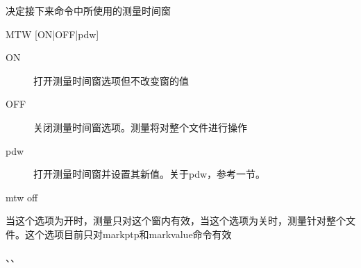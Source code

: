 \label{cmd:mtw}

决定接下来命令中所使用的测量时间窗

\begin{SACSTX}
MTW [ON|OFF|pdw]
\end{SACSTX}

\begin{description}
\item [ON] 打开测量时间窗选项但不改变窗的值 
\item [OFF] 关闭测量时间窗选项。测量将对整个文件进行操作 
\item [pdw] 打开测量时间窗并设置其新值。关于pdw，参考一节。
\end{description}

\begin{SACDFT}
mtw off
\end{SACDFT}

当这个选项为开时，测量只对这个窗内有效，当这个选项为关时，测量针对整个文件。这个选项目前只对markptp和markvalue命令有效

、、
